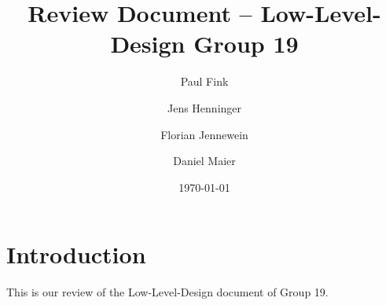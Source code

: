 \documentclass{article}
\title{Review Document -- Low-Level-Design Group 19 }
\author{Paul Fink \and Jens Henninger \and Florian Jennewein \and Daniel Maier}
\date{\today}
\begin{document}
\maketitle

\section{Introduction}
This is our review of the Low-Level-Design document of Group 19. 
 
\end{document}
